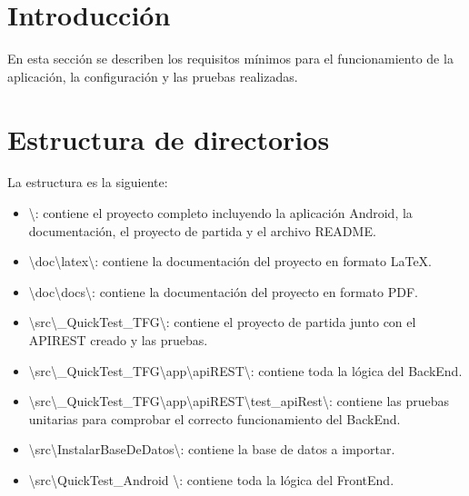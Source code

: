 
\section{Introducción}

En esta sección se describen los requisitos mínimos para el funcionamiento de la aplicación, la configuración y las pruebas realizadas.

\section{Estructura de directorios}

La estructura es la siguiente:

\begin{itemize}
	\item \textbackslash{}: contiene el proyecto completo incluyendo la aplicación Android, la documentación, el proyecto de partida y el archivo README.
	\item \textbackslash{}doc\textbackslash{}latex\textbackslash{}: contiene la documentación del proyecto en formato \LaTeX.
	
	\item \textbackslash{}doc\textbackslash{}docs\textbackslash{}: contiene la documentación del proyecto en formato PDF.
	
	\item \textbackslash{}src\textbackslash{}\_QuickTest\_TFG\textbackslash{}: contiene el proyecto de partida junto con el APIREST creado y las pruebas.
	
	\item \textbackslash{}src\textbackslash{}\_QuickTest\_TFG\textbackslash{}app\textbackslash{}apiREST\textbackslash{}: contiene toda la lógica del BackEnd.
	
	\item \textbackslash{}src\textbackslash{}\_QuickTest\_TFG\textbackslash{}app\textbackslash{}apiREST\textbackslash{}test\_apiRest\textbackslash{}: contiene las pruebas unitarias para comprobar el correcto funcionamiento del BackEnd.
	
	\item \textbackslash{}src\textbackslash{}InstalarBaseDeDatos\textbackslash{}: contiene la base de datos a importar.
	
	\item \textbackslash{}src\textbackslash{}QuickTest\_Android		\textbackslash{}: contiene toda la lógica del FrontEnd.
	

\end{itemize}
